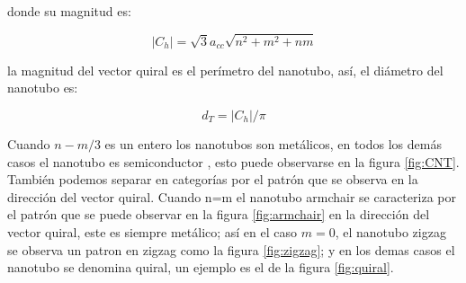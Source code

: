donde su magnitud es:

\begin{equation} \label{magnvectorquiral}
    \left|C_h\right| = \sqrt{3}a_{cc}\sqrt{n^2+m^2+nm}
\end{equation}

la magnitud del vector quiral es el perímetro del nanotubo, así, el diámetro del nanotubo es:

\begin{equation} \label{diametroCNT}
    d_T = \left|C_h\right|/\pi
\end{equation}






Cuando $n-m/3$ es un entero los nanotubos son metálicos, en todos los demás casos el nanotubo es semiconductor \cite{Melendez2016}, esto puede observarse en la figura \ref{fig:CNT}.\\

También podemos separar en categorías por el patrón que se observa en la dirección del vector quiral. Cuando n=m el nanotubo armchair se caracteriza por el patrón que se puede observar en la figura \ref{fig:armchair} en la dirección del vector quiral, este es siempre metálico; así en el caso $m=0$, el nanotubo zigzag se observa un patron en zigzag como la figura \ref{fig:zigzag}; y en los demas casos el nanotubo se denomina quiral, un ejemplo es el de la figura \ref{fig:quiral}.

